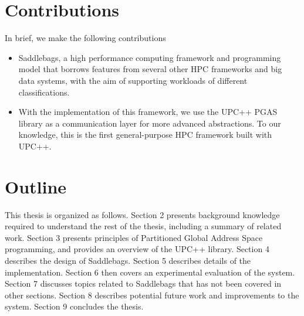 \documentclass{uit-report}
\begin{document}



\newpage
\section{Contributions}
In brief, we make the following contributions

\begin{itemize}
	\item Saddlebags, a high performance computing framework and programming model that borrows features from several other HPC frameworks and big data systems, with the aim of supporting workloads of different classifications.
	\item With the implementation of this framework, we use the UPC++ PGAS library as a communication layer for more advanced abstractions. To our knowledge, this is the first general-purpose HPC framework built with UPC++.
\end{itemize}









\section{Outline}
This thesis is organized as follows. Section 2 presents background knowledge required to understand the rest of the thesis, including a summary of related work. Section 3 presents principles of Partitioned Global Address Space programming, and provides an overview of the UPC++ library. Section 4 describes the design of Saddlebags. Section 5 describes details of the implementation. Section 6 then covers an experimental evaluation of the system. Section 7 discusses topics related to Saddlebags that has not been covered in other sections. Section 8 describes potential future work and improvements to the system. Section 9 concludes the thesis.
\end{document}

